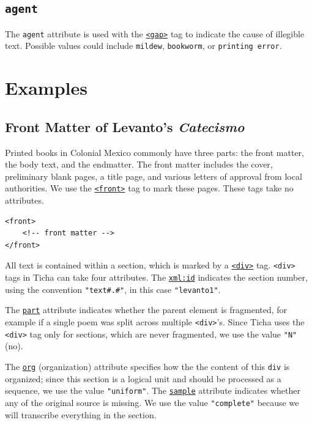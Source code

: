 \documentclass[12pt,a4paper]{article}
\begin{document}
\subsection{\texttt{agent}} \label{att-sec:agent}

The \texttt{agent} attribute is used with the \hyperref[tag-sec:gap]{\texttt{<gap>}} tag to indicate the cause of illegible text.  Possible values could include \texttt{mildew}, \texttt{bookworm}, or \texttt{printing error}.

\section{Examples}

\subsection{Front Matter of Levanto's \emph{Catecismo}}

Printed books in Colonial Mexico commonly have three parts: the front matter, the body text, and the endmatter.  The front matter includes the cover, preliminary blank pages, a title page, and various letters of approval from local authorities.  We use the \hyperref[tag-sec:frontbodyback]{\texttt{<front>}} tag to mark these pages.  These tags take no attributes.

\begin{lstlisting}
<front>
	<!-- front matter -->
</front>
\end{lstlisting}

All text is contained within a section, which is marked by a \hyperref[tag-sec:div]{\texttt{<div>}} tag.  \texttt{<div>} tags in Ticha can take four attributes.  The \hyperref[att-sec:xml:id]{\texttt{xml:id}} indicates the section number, using the convention \texttt{"text\#.\#"}, in this case \texttt{"levanto1"}.  

The \hyperref[att-sec:part]{\texttt{part}} attribute indicates whether  the parent element is fragmented, for example if a single poem was split across multiple \texttt{<div>}'s.  Since Ticha uses the \texttt{<div>} tag only for sections, which are never fragmented, we use the value \texttt{"N"} (no).

The \hyperref[att-sec:org]{\texttt{org}} (organization) attribute specifies how the the content of this \texttt{div} is organized; since this section is a logical unit and should be processed as a sequence, we use the value \texttt{"uniform"}.  The \hyperref[att-sec:sample]{\texttt{sample}} attribute 	indicates whether any of the original source is missing.  We use the value \texttt{"complete"} because we will transcribe everything in the section.
\end{document}
